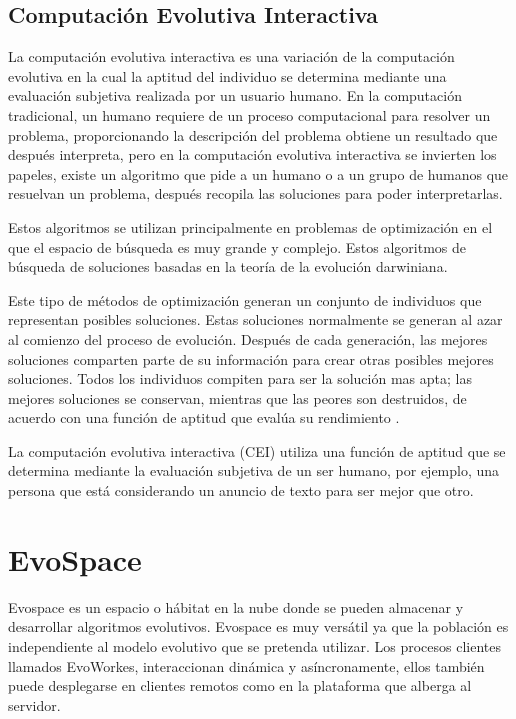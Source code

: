 \subsection{Computación Evolutiva Interactiva}

La computación evolutiva interactiva es una variación de la computación evolutiva en la cual la aptitud del individuo se determina mediante una evaluación subjetiva realizada por un usuario humano. En la computación tradicional, un humano requiere de un proceso computacional para resolver un problema, proporcionando la descripción del problema obtiene un resultado que después interpreta, pero en la computación evolutiva interactiva se invierten los papeles, existe un algoritmo que pide a un humano o a un grupo de humanos que resuelvan un problema, después recopila las soluciones para poder interpretarlas.\cite{dao2012novel}

Estos algoritmos se utilizan principalmente en problemas de optimización en el que el espacio de búsqueda es muy grande y complejo. Estos algoritmos de búsqueda de soluciones basadas en la teoría de la evolución darwiniana.
 
Este tipo de métodos de optimización generan un conjunto de individuos que representan posibles soluciones. Estas soluciones normalmente se generan al azar al comienzo del proceso de evolución. Después de cada generación, las mejores soluciones comparten parte de su información para crear otras posibles mejores soluciones. Todos los individuos compiten para ser la solución mas apta; las mejores soluciones se conservan, mientras que las peores son destruidos, de acuerdo con una función de aptitud que evalúa su rendimiento \cite{back1996evolutionary}. 

La computación evolutiva interactiva (CEI) utiliza una función de aptitud que se determina mediante la evaluación subjetiva de un ser humano, por ejemplo, una persona que está considerando un anuncio de texto para ser mejor que otro.

\section{EvoSpace}

Evospace es un espacio o hábitat en la nube donde se pueden almacenar y desarrollar algoritmos evolutivos. Evospace es muy versátil ya que la población es  independiente al modelo evolutivo que se pretenda utilizar. Los procesos clientes llamados EvoWorkes, interaccionan dinámica y asíncronamente, ellos también puede desplegarse en clientes remotos como en la plataforma que alberga al servidor.\cite{garcia2013evospace}